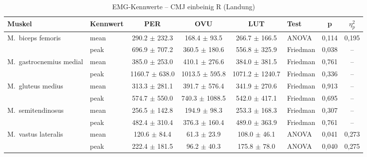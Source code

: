 \begin{table}[H]
  \centering
  \caption{EMG-Kennwerte – CMJ einbeinig R (Landung)}
  \label{tab:CMJ_einbeinig_R_Landung}
  \small
  \begin{tabular}{l l c c c l c c}
    \hline
    \textbf{Muskel} & \textbf{Kennwert} & \textbf{PER} & \textbf{OVU} & \textbf{LUT} & \textbf{Test} & \textbf{p} & \textbf{$\eta^2_p$} \\
    \hline
    M.~biceps femoris & mean & 290.2 $\pm$ 232.3 & 168.4 $\pm$ 93.5 & 266.7 $\pm$ 166.5 & ANOVA & 0{,}114 & 0{,}195 \\
     & peak & 696.9 $\pm$ 707.2 & 360.5 $\pm$ 180.6 & 556.8 $\pm$ 325.9 & Friedman & 0{,}038 & -- \\
    \hline
    M.~gastrocnemius medial & mean & 385.0 $\pm$ 253.0 & 410.1 $\pm$ 276.6 & 384.0 $\pm$ 381.5 & Friedman & 0{,}761 & -- \\
     & peak & 1160.7 $\pm$ 638.0 & 1013.5 $\pm$ 595.8 & 1071.2 $\pm$ 1240.7 & Friedman & 0{,}336 & -- \\
    \hline
    M.~gluteus medius & mean & 313.3 $\pm$ 281.1 & 391.7 $\pm$ 576.4 & 341.9 $\pm$ 270.6 & Friedman & 0{,}913 & -- \\
     & peak & 574.7 $\pm$ 550.0 & 740.3 $\pm$ 1088.5 & 542.0 $\pm$ 417.1 & Friedman & 0{,}695 & -- \\
    \hline
    M.~semitendinosus & mean & 256.5 $\pm$ 142.8 & 194.9 $\pm$ 98.3 & 253.3 $\pm$ 168.3 & Friedman & 0{,}307 & -- \\
     & peak & 482.4 $\pm$ 310.4 & 376.3 $\pm$ 160.4 & 489.0 $\pm$ 363.9 & Friedman & 0{,}761 & -- \\
    \hline
    M.~vastus lateralis & mean & 120.6 $\pm$ 84.4 & 61.3 $\pm$ 23.9 & 108.0 $\pm$ 46.1 & ANOVA & 0{,}041 & 0{,}273 \\
     & peak & 222.4 $\pm$ 181.5 & 96.2 $\pm$ 40.3 & 175.8 $\pm$ 78.0 & ANOVA & 0{,}040 & 0{,}275 \\
    \hline
  \end{tabular}
\end{table}

